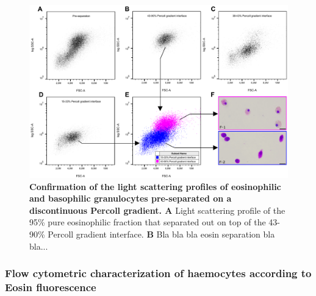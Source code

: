\begin{figure}[!ht]
    \centering
    \includegraphics[width=1.0\textwidth]{figures/Method development/PERCOLL SEP II.pdf}
    \caption{\textbf{Confirmation of the light scattering profiles of eosinophilic and basophilic granulocytes pre-separated on a discontinuous Percoll gradient. A} Light scattering profile of the 95\% pure eosinophilic fraction that separated out on top of the 43-90\% Percoll gradient interface. \textbf{B} Bla bla bla eosin separation bla bla...}
    \label{fig:Percoll-dotplots}
\end{figure}








\subsubsection{Flow cytometric characterization of haemocytes according to Eosin fluorescence}


